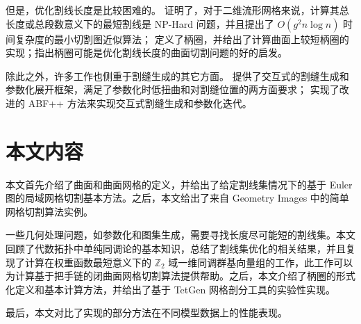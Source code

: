 但是，优化割线长度是比较困难的。\citet{Erickson2002} 证明了，对于二维流形网格来说，计算其总长度或总段数意义下的最短割线是 NP-Hard 问题，并且提出了 $ O(g^2 n \log n) $ 时间复杂度的最小切割图近似算法；\citet{oncomputinghantun} 定义了柄圈，并给出了计算曲面上较短柄圈的实现\cite{Dey2013}\cite{Dey2008}；\citet{Chai2018}指出柄圈可能是优化割线长度的曲面切割问题的好的启发。

除此之外，许多工作也侧重于割缝生成的其它方面。\citet{Poranne2017} 提供了交互式的割缝生成和参数化展开框架，满足了参数化时低扭曲和对割缝位置的两方面要求；\citet{wysiwyg} 实现了改进的 ABF++ 方法来实现交互式割缝生成和参数化迭代。

\section{本文内容}

本文首先介绍了曲面和曲面网格的定义，并给出了给定割线集情况下的基于 Euler 图的局域网格切割基本方法。之后，本文给出了来自 Geometry Images 中的简单网格切割算法实例。
  
一些几何处理问题，如参数化和图集生成，需要寻找长度尽可能短的割线集。本文回顾了代数拓扑中单纯同调论的基本知识，总结了割线集优化的相关结果，并且复现了计算在权重函数最短意义下的 $ \mathbb{Z}_2 $ 域一维同调群基向量组的工作，此工作可以为计算基于把手链的闭曲面网格切割算法提供帮助。之后，本文介绍了柄圈的形式化定义和基本计算方法，并给出了基于 TetGen 网格剖分工具的实验性实现。

最后，本文对比了实现的部分方法在不同模型数据上的性能表现。






